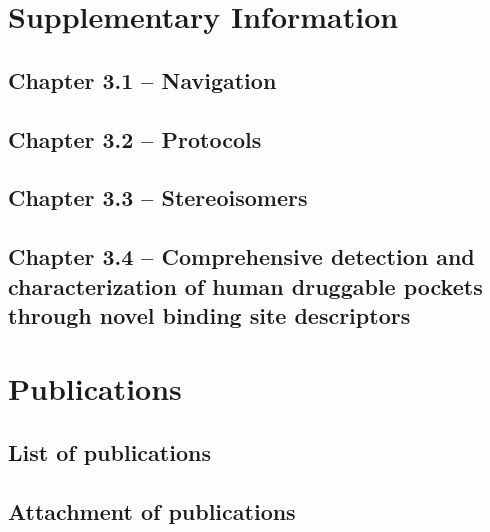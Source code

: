 \titleformat{\section}[block]
  {\normalfont\LARGE\bfseries}{\thesection}{1em}{}


\chapter{Supplementary Information}
\newpage

\section{Chapter 3.1 -- Navigation}
\section{Chapter 3.2 -- Protocols}
\section{Chapter 3.3 -- Stereoisomers}


\section{Chapter 3.4 -- Comprehensive detection and characterization of human druggable pockets through novel binding site descriptors}




\chapter{Publications}
\newpage
\section{List of publications}
\section{Attachment of publications}

